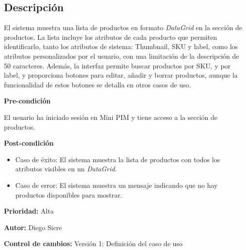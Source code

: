 {}

\subsection*{Descripción}
El sistema muestra una lista de productos en formato \textit{DataGrid} en la sección de productos. La lista incluye los atributos de cada producto que permiten identificarlo, tanto los atributos de sistema: Thumbnail, SKU y label, como los atributos personalizados por el usuario, con una limitación de la descripción de 50 caracteres. Además, la interfaz permite buscar productos por SKU, y por label, y proporciona botones para editar, añadir y borrar productos, aunque la funcionalidad de estos botones se detalla en otros casos de uso.

\vspace{0.15cm}

\textbf{Pre-condición}\par
El usuario ha iniciado sesión en Mini PIM y tiene acceso a la sección de productos.\par
\vspace{0.15cm}

\textbf{Post-condición}
\begin{itemize}
    \item Caso de éxito: El sistema muestra la lista de productos con todos los atributos visibles en un \textit{DataGrid}.
    \item Caso de error: El sistema muestra un mensaje indicando que no hay productos disponibles para mostrar.
\end{itemize}

\textbf{Prioridad: }
Alta
\vspace{0.15cm}

\textbf{Autor: }
Diego Sicre\par
\vspace{0.15cm}

\textbf{Control de cambios: } Versión 1: Definición del caso de uso

